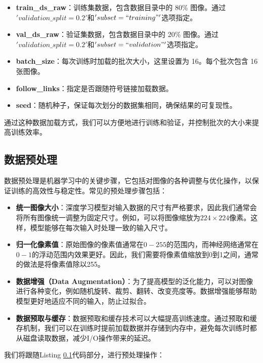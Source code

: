 \begin{itemize}
    \item \textbf{train\_ds\_raw}：训练集数据，包含数据目录中的 80\% 图像。通过$'validation\_split=0.2'$和$'subset=``training"'$选项指定。
    \item \textbf{val\_ds\_raw}：验证集数据，包含数据目录中的 20\% 图像。通过$'validation\_split=0.2'$和$'subset=``validation"'$选项指定。
    \item \textbf{batch\_size}：每次训练时加载的批次大小，这里设置为 16。每个批次包含 16 张图像。
    \item \textbf{follow\_links}：指定是否跟随符号链接加载数据。
    \item \textbf{seed}：随机种子，保证每次划分的数据集相同，确保结果的可复现性。
\end{itemize}

通过这种数据加载方式，我们可以方便地进行训练和验证，并控制批次的大小来提高训练效率。

\subsection{数据预处理}
\label{数据预处理}
数据预处理是机器学习中的关键步骤，它包括对图像的各种调整与优化操作，以保证训练的高效性与稳定性。常见的预处理步骤包括：

\begin{itemize}
    \item \textbf{统一图像大小}：深度学习模型对输入数据的尺寸有严格要求，因此我们通常会将所有图像统一调整为固定尺寸。例如，可以将图像缩放为$224 \times 224$像素。这样，模型能够在每次输入时处理一致的输入尺寸。
    \item \textbf{归一化像素值}：原始图像的像素值通常在$0-255$的范围内，而神经网络通常在$0-1$的浮动范围内效果更好。因此，我们需要将像素值缩放到0到1之间，通常的做法是将像素值除以255。
    \item \textbf{数据增强（Data Augmentation）}：为了提高模型的泛化能力，可以对图像进行各种变化，例如随机旋转、裁剪、翻转、改变亮度等。数据增强能够帮助模型更好地适应不同的输入，防止过拟合。
    \item \textbf{数据预取与缓存}：数据预取和缓存技术可以大幅提高训练速度。通过预取和缓存机制，我们可以在训练时提前加载数据并存储到内存中，避免每次训练时都从磁盘读取数据，减少I/O操作带来的延迟。
\end{itemize}

我们将跟随Listing \ref{数据预处理}代码部分，进行预处理操作：

